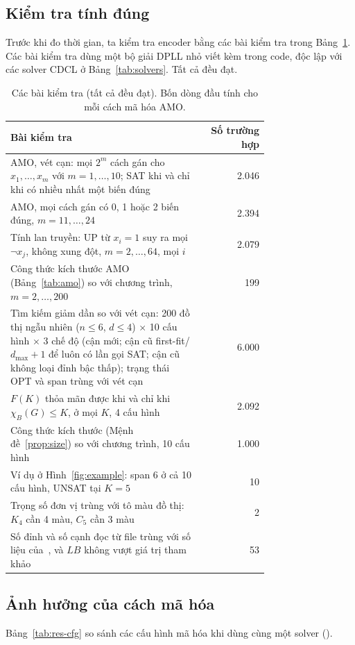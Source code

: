 \subsection{Kiểm tra tính đúng}\label{sec:validation}

Trước khi đo thời gian, ta kiểm tra encoder bằng các bài kiểm tra trong Bảng~\ref{tab:validation}. Các bài kiểm tra dùng một bộ giải DPLL nhỏ viết kèm trong code, độc lập với các solver CDCL ở Bảng~\ref{tab:solvers}. Tất cả đều đạt.

\begin{table}[width=\linewidth,pos=t]
\caption{Các bài kiểm tra (tất cả đều đạt). Bốn dòng đầu tính cho mỗi cách mã hóa AMO.}
\label{tab:validation}
\centering\small
\begin{tabular}{p{0.74\linewidth}r}
\toprule
Bài kiểm tra & Số trường hợp\\
\midrule
AMO, vét cạn: mọi $2^m$ cách gán cho $x_1,\dots,x_m$ với $m=1,\dots,10$; SAT khi và chỉ khi có nhiều nhất một biến đúng & 2.046\\
AMO, mọi cách gán có 0, 1 hoặc 2 biến đúng, $m=11,\dots,24$ & 2.394\\
Tính lan truyền: UP từ $x_i=1$ suy ra mọi $\neg x_j$, không xung đột, $m=2,\dots,64$, mọi $i$ & 2.079\\
Công thức kích thước AMO (Bảng~\ref{tab:amo}) so với chương trình, $m=2,\dots,200$ & 199\\
\midrule
Tìm kiếm giảm dần so với vét cạn: 200 đồ thị ngẫu nhiên ($n\le 6$, $d\le 4$) $\times$ 10 cấu hình $\times$ 3 chế độ (cận mới; cận cũ first-fit/$d_{\max}+1$ để luôn có lần gọi SAT; cận cũ không loại đỉnh bậc thấp); trạng thái OPT và span trùng với vét cạn & 6.000\\
$F(K)$ thỏa mãn được khi và chỉ khi $\chi_B(G)\le K$, ở mọi $K$, 4 cấu hình & 2.092\\
Công thức kích thước (Mệnh đề~\ref{prop:size}) so với chương trình, 10 cấu hình & 1.000\\
Ví dụ ở Hình~\ref{fig:example}: span 6 ở cả 10 cấu hình, UNSAT tại $K=5$ & 10\\
Trọng số đơn vị trùng với tô màu đồ thị: $K_4$ cần 4 màu, $C_5$ cần 3 màu & 2\\
Số đỉnh và số cạnh đọc từ file trùng với số liệu của~\citet{nguyen2026bcp}, và $LB$ không vượt giá trị tham khảo & 53\\
\bottomrule
\end{tabular}
\end{table}

\subsection{Ảnh hưởng của cách mã hóa}\label{sec:exp-cfg}

Bảng~\ref{tab:res-cfg} so sánh các cấu hình mã hóa khi dùng cùng một solver (\FixedSolver). \AutoCfg

\begin{table}[width=\linewidth,pos=t]
\caption{Ảnh hưởng của cách mã hóa với \FixedSolver: số đề chứng nhận tối ưu / tổng số đề (PAR-2, giây). Ô in đậm là tốt nhất trên mỗi cột.}
\label{tab:res-cfg}
\centering\small

\end{table}

